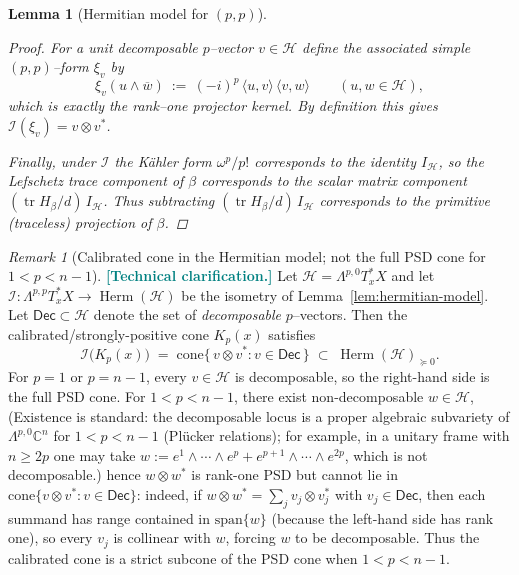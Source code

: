 \documentclass[11pt]{article}
\newcommand{\REVMZ}[1]{\textcolor{teal}{#1}}  %
\numberwithin{equation}{section}  %
\theoremstyle{plain}
\newtheorem{lemma}[theorem]{Lemma}
\theoremstyle{definition}
\theoremstyle{remark}
\newtheorem{remark}[theorem]{Remark}
\newcommand{\C}{\mathbb{C}}
\DeclareMathOperator{\Herm}{Herm}
\begin{document}
\begin{lemma}[Hermitian model for $(p,p)$]
\begin{proof}
For a unit decomposable $p$--vector $v\in\mathcal H$ define the associated simple $(p,p)$--form $\xi_v$ by
\[
\xi_v(u\wedge \overline{w})\ :=\ {(-i)^p}\,\langle u,v\rangle\,\langle v,w\rangle
\qquad (u,w\in\mathcal H),
\]
which is exactly the rank--one projector kernel.  By definition this gives $\mathcal I(\xi_v)=v\otimes v^*$.

Finally, under $\mathcal I$ the K\"ahler form $\omega^p/p!$ corresponds to the identity $I_{\mathcal H}$, so the Lefschetz trace component of $\beta$
corresponds to the scalar matrix component $(\operatorname{tr}H_\beta/d)\,I_{\mathcal H}$.
Thus subtracting $(\operatorname{tr}H_\beta/d)\,I_{\mathcal H}$ corresponds to the primitive (traceless) projection of $\beta$.
\end{proof}

\end{lemma}



\begin{remark}[Calibrated cone in the Hermitian model; not the full PSD cone for $1<p<n-1$]\label{rem:cone-not-full-psd}
\REVMZ{\textbf{[Technical clarification.]}}
Let $\mathcal H=\Lambda^{p,0}T_x^*X$ and let $\mathcal I:\Lambda^{p,p}T_x^*X\to\Herm(\mathcal H)$ be the isometry of Lemma~\ref{lem:hermitian-model}.
Let $\mathsf{Dec}\subset \mathcal H$ denote the set of \emph{decomposable} $p$--vectors.
Then the calibrated/strongly-positive cone $K_p(x)$ satisfies
\[
\mathcal I\bigl(K_p(x)\bigr)
\;=\;
\mathrm{cone}\{\, v\otimes v^*: v\in \mathsf{Dec}\,\}
\;\subset\;
\Herm(\mathcal H)_{\succeq 0}.
\]
For $p=1$ or $p=n-1$, every $v\in\mathcal H$ is decomposable, so the right-hand side is the full PSD cone.
For $1<p<n-1$, there exist non-decomposable $w\in\mathcal H$,
(Existence is standard: the decomposable locus is a proper algebraic subvariety of $\Lambda^{p,0}\C^{n}$ for $1<p<n-1$ (Pl\"ucker relations); for example, in a unitary frame with $n\ge 2p$ one may take $w:=e^{1}\wedge\cdots\wedge e^{p}+e^{p+1}\wedge\cdots\wedge e^{2p}$, which is not decomposable.) hence $w\otimes w^*$ is rank-one PSD but cannot lie in
$\mathrm{cone}\{v\otimes v^*: v\in\mathsf{Dec}\}$:
indeed, if $w\otimes w^*=\sum_j v_j\otimes v_j^*$ with $v_j\in\mathsf{Dec}$, then each summand has range contained in $\mathrm{span}\{w\}$ (because the left-hand side has rank one),
so every $v_j$ is collinear with $w$, forcing $w$ to be decomposable.  Thus the calibrated cone is a strict subcone of the PSD cone when $1<p<n-1$.
\end{remark}
\end{document}
